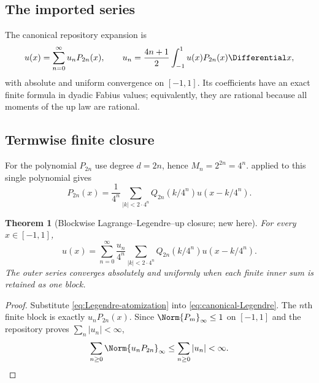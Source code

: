 \documentclass[11pt]{article}
\newtheorem{theorem}{Theorem}[section]
\theoremstyle{definition}
\theoremstyle{remark}
\begin{document}
\subsection{The imported series}

The canonical repository expansion is
\begin{equation}
 u(x)=\sum_{n=0}^{\infty}u_nP_{2n}(x),
 \qquad
 u_n=\frac{4n+1}{2}\int_{-1}^1u(x)P_{2n}(x)\Differential x,
 \label{eq:canonical-Legendre}
\end{equation}
with absolute and uniform convergence on $[-1,1]$.  Its coefficients have an
exact finite formula in dyadic Fabius values; equivalently, they are rational
because all moments of the up law are rational.

\begin{center}

\end{center}

\subsection{Termwise finite closure}

For the polynomial $P_{2n}$ use degree $d=2n$, hence
$M_n=2^{2n}=4^n$.   applied to this single
polynomial gives
\begin{equation}
 P_{2n}(x)=\frac1{4^n}
 \sum_{|k|<2\cdot4^n}Q_{2n}(k/4^n)u(x-k/4^n).
 \label{eq:Legendre-atomization}
\end{equation}

\begin{theorem}[Blockwise Lagrange--Legendre--up closure; new here]
\label{thm:block-loop}
For every $x\in[-1,1]$,
\begin{equation}
 \boxed{
 u(x)=\sum_{n=0}^{\infty}\frac{u_n}{4^n}
 \sum_{|k|<2\cdot4^n}
 Q_{2n}(k/4^n)u(x-k/4^n).}
 \label{eq:block-loop}
\end{equation}
The outer series converges absolutely and uniformly when each finite inner sum
is retained as one block.
\end{theorem}

\begin{proof}
Substitute \eqref{eq:Legendre-atomization} into
\eqref{eq:canonical-Legendre}.  The $n$th finite block is exactly
$u_nP_{2n}(x)$.  Since $\Norm{P_m}_\infty\le1$ on $[-1,1]$ and the repository
proves $\sum_n|u_n|<\infty$,
\[
 \sum_{n\ge0}\Norm{u_nP_{2n}}_\infty\le\sum_{n\ge0}|u_n|<\infty.
\]
\end{proof}
\end{document}
